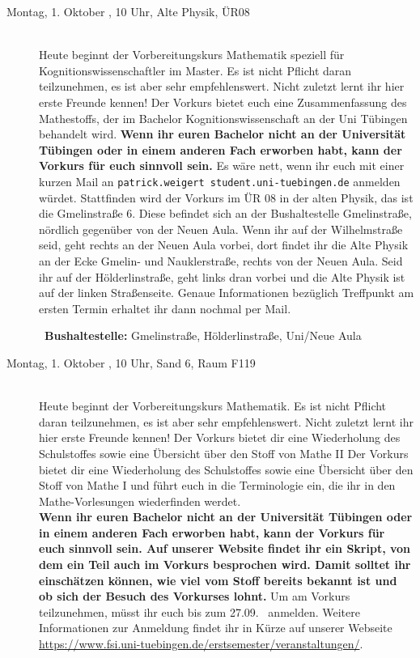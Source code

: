 \begin{description}

\ifkogwiss
\ifmaster
\item[Montag, 1. Oktober \YEAR, 10 Uhr, Alte Physik, ÜR08]\ \\
Heute beginnt der Vorbereitungskurs Mathematik speziell für Kognitionswissenschaftler im Master. Es ist nicht Pflicht daran teilzunehmen, es ist aber sehr empfehlenswert. Nicht zuletzt lernt ihr hier erste Freunde kennen! Der Vorkurs bietet euch eine Zusammenfassung des Mathestoffs, der im Bachelor Kognitionswissenschaft an der Uni Tübingen behandelt wird.
\textbf{Wenn ihr euren Bachelor nicht an der Universität Tübingen oder in einem anderen Fach erworben habt, kann der Vorkurs für euch sinnvoll sein.} Es wäre nett, wenn ihr euch mit einer kurzen Mail an \texttt{patrick.weigert \At student.uni-tuebingen.de} anmelden würdet.
Stattfinden wird der Vorkurs im ÜR 08 in der alten Physik, das ist die Gmelinstraße 6. Diese befindet sich an der Bushaltestelle Gmelinstraße, nördlich gegenüber von der Neuen Aula. Wenn ihr auf der Wilhelmstraße seid, geht rechts an der Neuen Aula vorbei, dort findet ihr die Alte Physik an der Ecke Gmelin- und Nauklerstraße, rechts von der Neuen Aula. Seid ihr auf der Hölderlinstraße, geht links dran vorbei und die Alte Physik ist auf der linken Straßenseite. Genaue Informationen bezüglich Treffpunkt am ersten Termin erhaltet ihr dann nochmal per Mail.

~\textbf{Bushaltestelle:} Gmelinstraße, Hölderlinstraße, Uni/Neue Aula

\else
\item[Montag, 1. Oktober \YEAR, 10 Uhr, Sand 6, Raum F119]\ \\
Heute beginnt der Vorbereitungskurs Mathematik. Es ist nicht Pflicht daran teilzunehmen,
es ist aber sehr empfehlenswert. Nicht zuletzt lernt ihr hier erste Freunde kennen!
\ifsommersemester
Der Vorkurs bietet dir eine Wiederholung des Schulstoffes sowie eine Übersicht über den Stoff von Mathe II
\fi
\ifwintersemester
Der Vorkurs bietet dir eine Wiederholung des Schulstoffes sowie eine Übersicht über den Stoff von Mathe I
\fi
und führt euch in die Terminologie ein, die ihr in den Mathe-Vorlesungen wiederfinden werdet.
\ifmaster
\\
\textbf{Wenn ihr euren Bachelor nicht an der Universität Tübingen oder in einem anderen Fach erworben habt, kann der Vorkurs für euch sinnvoll sein. Auf unserer Website findet ihr ein Skript, von dem ein Teil auch im Vorkurs besprochen wird. Damit solltet ihr einschätzen können, wie viel vom Stoff bereits bekannt ist und ob sich der Besuch des Vorkurses lohnt.}
\fi
Um am Vorkurs teilzunehmen, müsst ihr euch bis zum 27.09. \YEAR~anmelden. Weitere Informationen zur Anmeldung findet ihr in Kürze auf unserer Webseite \url{https://www.fsi.uni-tuebingen.de/erstsemester/veranstaltungen/}.


\end{description}
